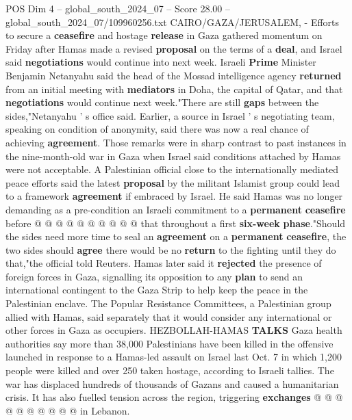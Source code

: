 \begin{textsample}{POS Dim 4 – global\_south\_2024\_07 – Score 28.00 – global\_south\_2024\_07/109960256.txt}  \label{ex:f4_pos_111}
CAIRO/GAZA/JERUSALEM, - Efforts to secure a \textbf{ceasefire} and hostage \textbf{release} in Gaza gathered momentum on Friday after Hamas made a revised \textbf{proposal} on the terms of a \textbf{deal}, and Israel said \textbf{negotiations} would continue into next week.
Israeli \textbf{Prime} Minister Benjamin Netanyahu said the head of the Mossad intelligence agency \textbf{returned} from an initial meeting with \textbf{mediators} in Doha, the capital of Qatar, and that \textbf{negotiations} would continue next week."There are still \textbf{gaps} between the sides,"Netanyahu ' s office said.
Earlier, a source in Israel ' s negotiating team, speaking on condition of anonymity, said there was now a real chance of achieving \textbf{agreement}.
Those remarks were in sharp contrast to past instances in the nine-month-old war in Gaza when Israel said conditions attached by Hamas were not acceptable.
A Palestinian official close to the internationally mediated peace efforts said the latest \textbf{proposal} by the militant Islamist group could lead to a framework \textbf{agreement} if embraced by Israel.
He said Hamas was no longer demanding as a pre-condition an Israeli commitment to a \textbf{permanent} \textbf{ceasefire} before @ @ @ @ @ @ @ @ @ @ that throughout a first \textbf{six-week} \textbf{phase}."Should the sides need more time to seal an \textbf{agreement} on a \textbf{permanent} \textbf{ceasefire}, the two sides should \textbf{agree} there would be no \textbf{return} to the fighting until they do that,"the official told Reuters.
Hamas later said it \textbf{rejected} the presence of foreign forces in Gaza, signalling its opposition to any \textbf{plan} to send an international contingent to the Gaza Strip to help keep the peace in the Palestinian enclave.
The Popular Resistance Committees, a Palestinian group allied with Hamas, said separately that it would consider any international or other forces in Gaza as occupiers.
HEZBOLLAH-HAMAS \textbf{TALKS} Gaza health authorities say more than 38,000 Palestinians have been killed in the offensive launched in response to a Hamas-led assault on Israel last Oct. 7 in which 1,200 people were killed and over 250 taken hostage, according to Israeli tallies.
The war has displaced hundreds of thousands of Gazans and caused a humanitarian crisis.
It has also fuelled tension across the region, triggering \textbf{exchanges} @ @ @ @ @ @ @ @ @ @ in Lebanon.

\end{textsample}
